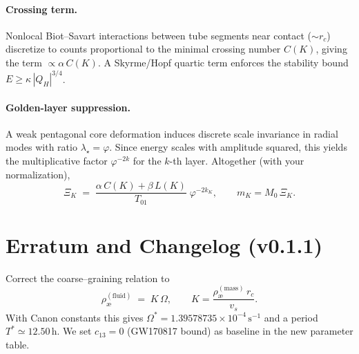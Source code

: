 \paragraph{Crossing term.}
Nonlocal Biot--Savart interactions between tube segments near contact (\(\sim r_c\)) discretize to counts proportional to the minimal crossing number \(C(K)\), giving
the term \(\propto \alpha\,C(K)\). A Skyrme/Hopf quartic term enforces the stability bound \(E\ge \kappa\,|Q_H|^{3/4}\).

\paragraph{Golden-layer suppression.}
A weak pentagonal core deformation induces discrete scale invariance in radial modes with ratio \(\lambda_\star=\varphi\).
Since energy scales with amplitude squared, this yields the multiplicative factor \(\varphi^{-2k}\) for the \(k\)-th layer.
Altogether (with your normalization),
\begin{equation}
\Xi_K \;=\; \frac{\alpha\,C(K)+\beta\,L(K)}{T_{01}}\;\varphi^{-2k_K},\qquad m_K = M_0\,\Xi_K.
\end{equation}

\clearpage
\section*{Erratum and Changelog (v0.1.1)}
Correct the coarse--graining relation to
\begin{equation}
\rho_{\text{\ae}}^{(\text{fluid})} \;=\; K\,\Omega,\qquad
K=\frac{\rho_{\text{\ae}}^{(\text{mass})}\,r_c}{v_s}.
\end{equation}
With Canon constants this gives \(\Omega^\ast=1.39578735\times10^{-4}\,\mathrm{s^{-1}}\) and a period \(T^\ast\simeq 12.50\,\mathrm{h}\).
We set \(c_{13}=0\) (GW170817 bound) as baseline in the new parameter table.
\nocite{JacobsonMattingly2004,Jacobson2008,BlasPujolasSibiryakov2010,SMEDataTables2025,Abbott2017GW170817,MooreNelson2001,BarceloLiberatiVisser2011,Nakahara2003,MerminHo1976,Wen2002,Fradkin2013,VakulenkoKapitanskii1979,GladikowskiHellmund1997,Thurston1997,Sornette1998}
